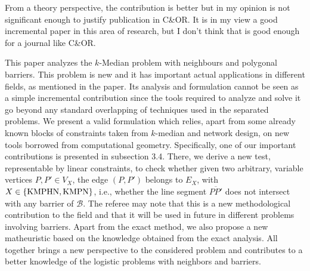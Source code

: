 \documentclass{article}
\newenvironment{reviewer}{\setcounter{pointcounter}{1}}{}
\newcommand{\point}{\text{{\selectfont \thepointcounter} \stepcounter{pointcounter}}}
\newcommand{\JP}[1]{{\color{blue}#1}}
\begin{document}
\begin{reviewer}
		\begin{itshape}
			From a theory perspective, the contribution is better but in my opinion is not significant enough to justify publication in C\&OR. It is in my view a good incremental paper in this area of research, but I don't think that is good enough for a journal like C\&OR.
		\end{itshape}
		
		\begin{tcolorbox}[breakable,enhanced,coltitle=black,colback=red!5!white,colframe=red!75!black,title=\textbf{Answer R1.\point},borderline={1pt}{0pt}{black},boxrule=0pt]
\JP{ This paper analyzes the $k$-Median  problem with neighbours and polygonal barriers. This problem is new and it has important actual applications in different fields, as mentioned in the paper. Its analysis and formulation cannot be  seen as a simple incremental contribution since  the tools required to analyze and solve it go beyond any standard overlapping of techniques used in the separated problems. We present a valid formulation which  relies, apart from some already known blocks of constraints taken from $k$-median and network design,  on new tools borrowed from computational geometry. Specifically, one of our} \JP{important contributions  is presented in subsection 3.4. There, we derive a new test, representable by linear constraints, to check whether given two arbitrary, variable vertices $P, P'\in V_X$, the edge $(P, P')$ belongs to $E_X$, with $X\in\{\rm KMPHN, \rm KMPN\}$, i.e., whether the line segment $\overline{PP'}$ does not intersect with any barrier of $\mathcal B$.  The referee may note that this is a new methodological contribution to the field and that it will be used in future in different problems involving barriers. Apart from the exact method, we also propose a new matheuristic based on the knowledge obtained from the exact analysis. All together brings a new perspective to the considered problem and contributes to a better knowledge of the logistic problems with neighbors and barriers.}

		\end{tcolorbox}
		
	\end{reviewer}
	
\end{document}
